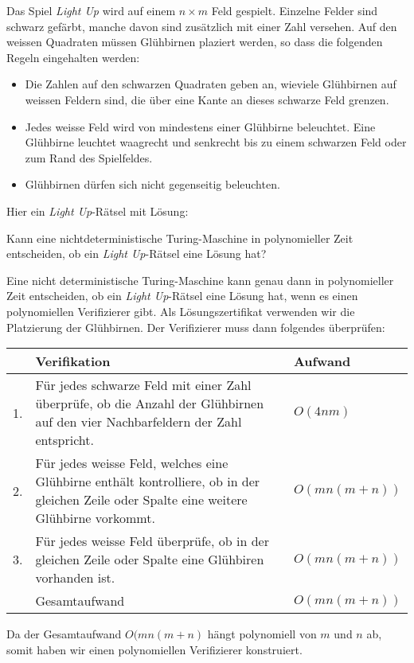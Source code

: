 Das Spiel {\em Light Up} wird auf einem $n\times m$ Feld gespielt.
Einzelne Felder sind schwarz gefärbt, manche davon sind zusätzlich
mit einer Zahl versehen.
Auf den weissen Quadraten müssen Glühbirnen plaziert werden,
so dass die folgenden Regeln eingehalten werden: 
\begin{itemize}
\item
Die Zahlen auf den schwarzen Quadraten geben an, wieviele Glühbirnen
auf weissen Feldern sind, die über eine Kante an dieses schwarze Feld grenzen. 
\item
Jedes weisse Feld wird von mindestens einer Glühbirne beleuchtet.
Eine Glühbirne leuchtet waagrecht und senkrecht bis zu einem schwarzen Feld
oder zum Rand des Spielfeldes. 
\item
Glühbirnen dürfen sich nicht gegenseitig beleuchten. 
\end{itemize}
Hier ein {\em Light Up}-Rätsel mit Lösung:
\begin{center}
\qquad
{}
\end{center}

Kann eine nichtdeterministische Turing-Maschine in polynomieller Zeit
entscheiden, ob ein {\em Light Up}-Rätsel eine Lösung hat?

\begin{loesung}
Eine nicht deterministische Turing-Maschine kann genau dann in polynomieller
Zeit entscheiden, ob ein {\em Light Up}-Rätsel eine Lösung hat,
wenn es einen polynomiellen Verifizierer gibt.
Als Lösungszertifikat verwenden wir die Platzierung der Glühbirnen.
Der Verifizierer muss dann folgendes überprüfen:
\begin{center}
\begin{tabular}{rll}
  &Verifikation&Aufwand\\
\hline
1.&\begin{minipage}[t]{12cm}\strut
Für jedes schwarze Feld mit einer Zahl überprüfe, ob die Anzahl
der Glühbirnen auf den vier Nachbarfeldern der Zahl entspricht.
\strut\end{minipage}&$O(4nm)$\\
2.&\begin{minipage}[t]{12cm}\strut
Für jedes weisse Feld, welches eine Glühbirne enthält kontrolliere,
ob in der gleichen Zeile oder Spalte eine weitere Glühbirne vorkommt.
\strut\end{minipage}&$O(mn(m+n))$\\
3.&\begin{minipage}[t]{12cm}\strut
Für jedes weisse Feld überprüfe, ob in der gleichen Zeile oder
Spalte eine Glühbiren vorhanden ist.
\strut\end{minipage}&$O(mn(m+n))$\\
\hline
&Gesamtaufwand&$O(mn(m+n))$
\end{tabular}
\end{center}
Da der Gesamtaufwand $O(mn(m+n)$ hängt polynomiell von $m$ und $n$
ab, somit haben wir einen polynomiellen Verifizierer konstruiert.
\end{loesung}


